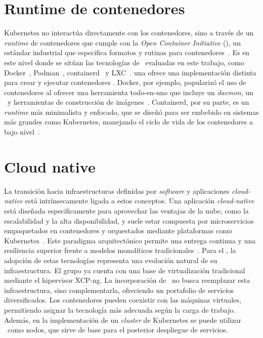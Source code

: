 \section{Runtime de contenedores}
\noindent
Kubernetes no interactúa directamente con los contenedores, sino a través de un \textit{runtime} de contenedores que cumple con la \textit{Open Container Initiative} (\OCI), un estándar industrial que especifica formatos y rutinas para contenedores~\citep{girma2018evaluation}. Es en este nivel donde se sitúan las tecnologías de \VBC\ evaluadas en este trabajo, como Docker~\citep{docker_website}, Podman~\citep{podman_website}, containerd~\citep{containerd_website} y LXC~\citep{lxc_website}. \@Cada una ofrece una implementación distinta para crear y ejecutar contenedores \OCI. Docker, por ejemplo, popularizó el uso de contenedores al ofrecer una herramienta todo-en-uno que incluye un \textit{daemon}, un \CLI\ y herramientas de construcción de imágenes~\citep{Buchanan2020}. Containerd, por su parte, es un \textit{runtime} más minimalista y enfocado, que se diseñó para ser embebido en sistemas más grandes como Kubernetes, manejando el ciclo de vida de los contenedores a bajo nivel~\citep{protogeros2024cargosync}.

\section{Cloud native}
\noindent
La transición hacia infraestructuras definidas por \textit{software} y aplicaciones \textit{cloud-native} está intrínsecamente ligada a estos conceptos. Una aplicación \textit{cloud-native} está diseñada específicamente para aprovechar las ventajas de la nube, como la escalabilidad y la alta disponibilidad, y suele estar compuesta por microservicios empaquetados en contenedores y orquestados mediante plataformas como Kubernetes~\citep{gannon2017cloud}. Este paradigma arquitectónico permite una entrega continua y una resiliencia superior frente a modelos monolíticos tradicionales~\citep{oyeniran2024comprehensive}. Para el \GRID, la adopción de estas tecnologías representa una evolución natural de su infraestructura. El grupo ya cuenta con una base de virtualización tradicional mediante el hipervisor XCP-ng. La incorporación de \VBC\ no busca reemplazar esta infraestructura, sino complementarla, ofreciendo un portafolio de servicios diversificados. Los contenedores pueden coexistir con las máquinas virtuales, permitiendo asignar la tecnología más adecuada según la carga de trabajo. Además, en la implementación de un \textit{cluster} de Kubernetes se puede utilizar \VM\ como nodos, que sirve de base para el posterior despliegue de servicios.

